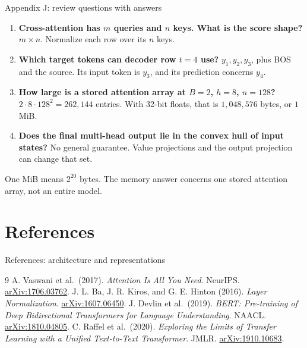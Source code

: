 \documentclass[aspectratio=169,11pt]{beamer}
\newcommand{\src}[1]{\par\vfill{\fontsize{7}{8.5}\selectfont\color{muted}#1}\par}
\begin{document}
\begin{frame}[t]{Appendix J: review questions with answers}
\small
\begin{enumerate}
 \item \textbf{Cross-attention has $m$ queries and $n$ keys. What is the score shape?}
       $m\times n$. Normalize each row over its $n$ keys.
 \item \textbf{Which target tokens can decoder row $t=4$ use?}
       $y_1,y_2,y_3$, plus BOS and the source. Its input token is $y_3$,
       and its prediction concerns $y_4$.
 \item \textbf{How large is a stored attention array at $B=2$, $h=8$, $n=128$?}
       $2\cdot8\cdot128^2=262{,}144$ entries. With 32-bit floats,
       that is $1{,}048{,}576$ bytes, or $1$ MiB.
 \item \textbf{Does the final multi-head output lie in the convex hull of input states?}
       No general guarantee. Value projections and the output projection
       can change that set.
\end{enumerate}
\src{One MiB means $2^{20}$ bytes. The memory answer concerns one stored attention array, not an entire model.}
\end{frame}

\section{References}
\begin{frame}[t]{References: architecture and representations}
\small
\begin{thebibliography}{9}
A. Vaswani et al.\ (2017).
\emph{Attention Is All You Need}. NeurIPS.
\href{https://arxiv.org/abs/1706.03762}{arXiv:1706.03762}.
J. L. Ba, J. R. Kiros, and G. E. Hinton (2016).
\emph{Layer Normalization}.
\href{https://arxiv.org/abs/1607.06450}{arXiv:1607.06450}.
J. Devlin et al.\ (2019).
\emph{BERT: Pre-training of Deep Bidirectional Transformers for Language Understanding}. NAACL.
\href{https://arxiv.org/abs/1810.04805}{arXiv:1810.04805}.
C. Raffel et al.\ (2020).
\emph{Exploring the Limits of Transfer Learning with a Unified Text-to-Text Transformer}. JMLR.
\href{https://arxiv.org/abs/1910.10683}{arXiv:1910.10683}.
\end{thebibliography}
\end{frame}
\end{document}
